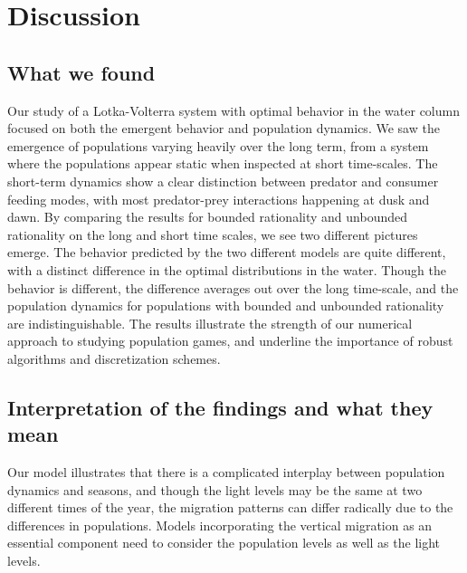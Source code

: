 \section{Discussion}
\subsection*{What we found} %

Our study of a Lotka-Volterra system with optimal behavior in the water column focused on both the emergent behavior and population dynamics. We saw the emergence of populations varying heavily over the long term, from a system where the populations appear static when inspected at short time-scales. The short-term dynamics show a clear distinction between predator and consumer feeding modes, with most predator-prey interactions happening at dusk and dawn. By comparing the results for bounded rationality and unbounded rationality on the long and short time scales, we see two different pictures emerge. The behavior predicted by the two different models are quite different, with a distinct difference in the optimal distributions in the water. Though the behavior is different, the difference averages out over the long time-scale, and the population dynamics for populations with bounded and unbounded rationality are indistinguishable. The results illustrate the strength of our numerical approach to studying population games, and underline the importance of robust algorithms and discretization schemes.


\subsection*{Interpretation of the findings and what they mean} %
Our model illustrates that there is a complicated interplay between population dynamics and seasons, and though the light levels may be the same at two different times of the year, the migration patterns can differ radically due to the differences in populations. Models incorporating the vertical migration as an essential component need to consider the population levels as well as the light levels.  



